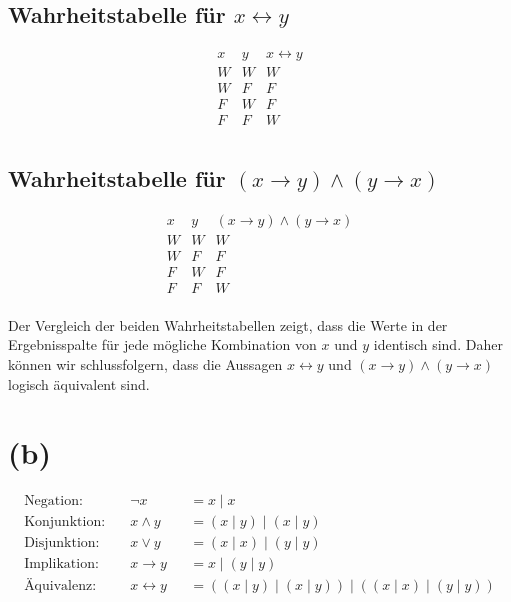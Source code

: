 \documentclass[12pt]{article}
\begin{document}
\subsection*{Wahrheitstabelle für \( x \leftrightarrow y \)}
\[
	\begin{array}{cc|c}
		x & y & x \leftrightarrow y \\
		\hline
		W & W & W                   \\
		W & F & F                   \\
		F & W & F                   \\
		F & F & W                   \\
	\end{array}
\]

\subsection*{Wahrheitstabelle für \( (x \rightarrow y) \land (y \rightarrow x) \)}
\[
	\begin{array}{cc|c}
		x & y & (x \rightarrow y) \land (y \rightarrow x) \\
		\hline
		W & W & W                                         \\
		W & F & F                                         \\
		F & W & F                                         \\
		F & F & W                                         \\
	\end{array}
\]

Der Vergleich der beiden Wahrheitstabellen zeigt, dass die Werte in der Ergebnisspalte für jede mögliche Kombination von \( x \) und \( y \) identisch sind. Daher können wir schlussfolgern, dass die Aussagen \( x \leftrightarrow y \) und \( (x \rightarrow y) \land (y \rightarrow x) \) logisch äquivalent sind.

\section*{(b)}


\begin{align*}
	\text{Negation:}    & \quad \neg x              &  & = x \mid x                                                       \\
	\text{Konjunktion:} & \quad x \land y           &  & = (x \mid y) \mid (x \mid y)                                     \\
	\text{Disjunktion:} & \quad x \lor y            &  & = (x \mid x) \mid (y \mid y)                                     \\
	\text{Implikation:} & \quad x \rightarrow y     &  & = x \mid (y \mid y)                                              \\
	\text{Äquivalenz:}  & \quad x \leftrightarrow y &  & = ((x \mid y) \mid (x \mid y)) \mid ((x \mid x) \mid (y \mid y))
\end{align*}
\end{document}
